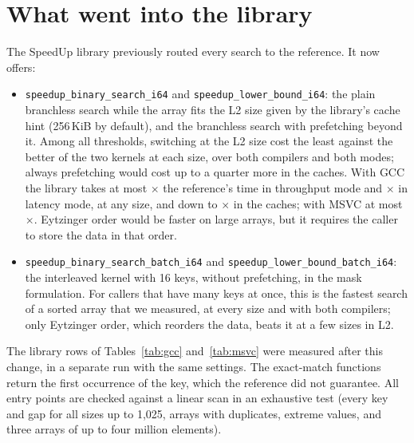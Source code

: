 \documentclass[11pt]{article}
\begin{document}
\begin{table}[t]
\centering
\caption{MSVC 19.41, nanoseconds per search (median); compare Table~\ref{tab:gcc}.}
\label{tab:msvc}
\resizebox{\linewidth}{!}{}
\end{table}

\section{What went into the library}\label{sec:library}

The SpeedUp library previously routed every search to the reference. It now
offers:
\begin{itemize}
\item \texttt{speedup\_binary\_search\_i64} and \texttt{speedup\_lower\_bound\_i64}:
  the plain branchless search while the array fits the L2 size given by the
  library's cache hint (256\,KiB by default), and the branchless search with
  prefetching beyond it. Among all thresholds, switching at the L2 size cost
  the least against the better of the two kernels at each size, over both
  compilers and both modes; always prefetching would cost up to a quarter more
  in the caches. With GCC the library takes at most
  $\times$ the reference's time in
  throughput mode and $\times$ in
  latency mode, at any size, and down to
  $\times$ in the caches; with
  MSVC at most $\times$. Eytzinger
  order would be faster on large arrays, but it requires the caller to store the
  data in that order.
\item \texttt{speedup\_binary\_search\_batch\_i64} and
  \texttt{speedup\_lower\_bound\_batch\_i64}: the interleaved kernel with 16 keys,
  without prefetching, in the mask formulation. For callers that have many keys
  at once, this is the fastest search of a sorted array that we measured, at
  every size and with both compilers; only Eytzinger order, which reorders the
  data, beats it at a few sizes in L2.
\end{itemize}
The library rows of Tables~\ref{tab:gcc} and~\ref{tab:msvc} were measured after
this change, in a separate run with the same settings. The exact-match
functions return the first occurrence of the key, which the reference did not
guarantee. All entry points are checked against a linear
scan in an exhaustive test (every key and gap for all sizes up to 1{,}025,
arrays with duplicates, extreme values, and three arrays of up to four million
elements).
\end{document}
